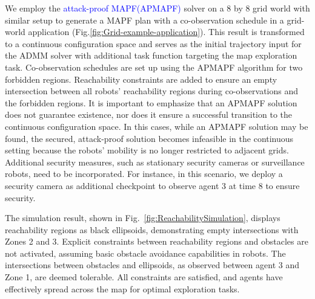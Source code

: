 \documentclass[10pt,twocolumn,twoside]{IEEEtran}
\newcommand{\new}[1]{\textcolor{blue}{#1}}
\newcommand{\news}{\color{blue}}
\begin{document}
We employ the \new{attack-proof MAPF(APMAPF)} solver \cite{wardega2019resilience} on a 8 by 8 grid world with similar setup to generate a MAPF plan with a co-observation schedule in a grid-world application (Fig.\ref{fig:Grid-example-application}). This result is transformed to a continuous configuration space and serves as the initial trajectory input for the ADMM solver with additional task function targeting the map exploration task. Co-observation schedules are set up using the APMAPF algorithm for two forbidden regions. Reachability constraints are added to ensure an empty intersection between all robots' reachability regions during co-observations and the forbidden regions. {\news It is important to emphasize that an APMAPF solution does not guarantee existence, nor does it ensure a successful transition to the continuous configuration space. In this cases, while an APMAPF solution may be found, the secured, attack-proof solution becomes infeasible in the continuous setting because the robots' mobility is no longer restricted to adjacent grids. Additional security measures, such as stationary security cameras or surveillance robots, need to be incorporated. For instance, in this scenario, we deploy a security camera as additional checkpoint to observe agent 3 at time $8$ to ensure security.}

The simulation result, shown in Fig.~\ref{fig:ReachabilitySimulation}, displays reachability regions as black ellipsoids, demonstrating empty intersections with Zones 2 and 3. Explicit constraints between reachability regions and obstacles are not activated, assuming basic obstacle avoidance capabilities in robots. The intersections between obstacles and ellipsoids, as observed between agent 3 and Zone 1, are deemed tolerable. All constraints are satisfied, and agents have effectively spread across the map for optimal exploration tasks.

\end{document}
